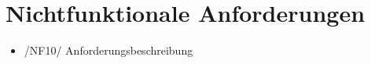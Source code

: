 \section{Nichtfunktionale Anforderungen}

\begin{itemize}
\item /NF10/ Anforderungsbeschreibung
\end{itemize}